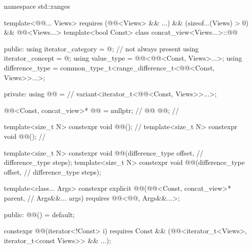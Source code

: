 %
\begin{codeblock}
namespace std::ranges {
  template<@@... Views>
    requires (@@<Views> && ...) && (sizeof...(Views) > 0) &&
              @@<Views...>
  template<bool Const>
  class concat_view<Views...>::@@ {

  public:
    using iterator_category = @\seebelow@;                                // not always present
    using iterator_concept = @\seebelow@;
    using value_type = @@<@@<Const, Views>...>;
    using difference_type = common_type_t<range_difference_t<@@<Const, Views>>...>;

  private:
    using @@ =                                                       // \expos
      variant<iterator_t<@@<Const, Views>>...>;

    @@<Const, concat_view>* @@ = nullptr;                     // \expos
    @@ @@;                                                          // \expos

    template<size_t N>
      constexpr void @@();                                             // \expos
    template<size_t N>
      constexpr void @@();                                                // \expos

    template<size_t N>
      constexpr void @@(difference_type offset,                    // \expos
                                 difference_type steps);
    template<size_t N>
      constexpr void @@(difference_type offset,                    // \expos
                                 difference_type steps);

    template<class... Args>
      constexpr explicit @@(@@<Const, concat_view>* parent,  // \expos
                                  Args&&... args)
        requires @@<@@, Args&&...>;

  public:
    @@() = default;

    constexpr @@(iterator<!Const> i)
      requires Const && (@@<iterator_t<Views>, iterator_t<const Views>> && ...);

}}
\end{codeblock}
